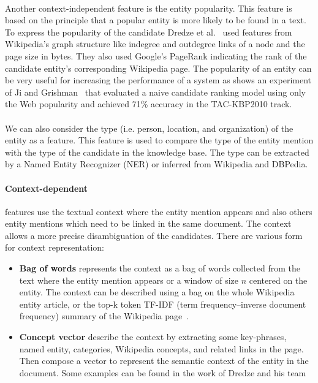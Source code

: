 \paragraph{} Another context-independent feature is the entity popularity. This feature is based on the principle that a popular entity is more likely to be found in a text. To express the popularity of the candidate Dredze et al.~\cite{dredze2010entity} used features from Wikipedia's graph structure like indegree and outdegree links of a node and the page size in bytes. They also used Google's PageRank indicating the rank of the candidate entity's corresponding Wikipedia page. The popularity of an entity can be very useful for increasing the performance of a system as shows an experiment of Ji and Grishman~\cite{ji2011knowledge} that evaluated a naive candidate ranking model using only the Web popularity and achieved 71\% accuracy in the TAC-KBP2010 track.

\paragraph{} We can also consider the type (i.e. person, location, and organization) of the entity as a feature. This feature is used to compare the type of the entity mention with the type of the candidate in the knowledge base. The type can be extracted by a Named Entity Recognizer (NER) or inferred from Wikipedia and DBPedia.

\paragraph{Context-dependent} features use the textual context where the entity mention appears and also others entity mentions which need to be linked in the same document. The context allows a more precise disambiguation of the candidates. There are various form for context representation:

\begin{itemize}[topsep=10pt]
\item \textbf{Bag of words} represents the context as a bag of words collected from the text where the entity mention appears or a window of size $n$ centered on the entity. The context can be described using a bag on the whole Wikipedia entity article, or the top-k token TF-IDF (term frequency–inverse document frequency) summary of the Wikipedia page~\cite{ratinov2011local}.  

\item \textbf{Concept vector} describe the context by extracting some key-phrases, named entity, categories, Wikipedia concepts, and related links in the page. Then compose a vector to represent the semantic context of the entity in the document. Some examples can be found in the work of Dredze and his team~\cite{dredze2010entity}
\end{itemize}

